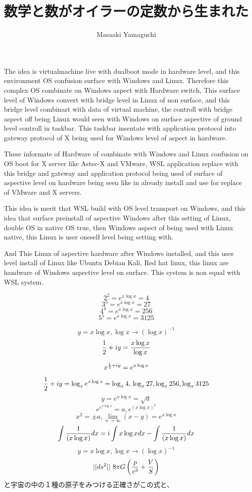 \documentclass{jsarticle}
\begin{document}
{       The idea is virtualmachine live with dualboot mode in hardware level,
   and this environment OS confusion surface with Windows and Linux.
   Therefore this complex OS combinate on Windows aspect with Hardware switch, 
   This surface level of Windows convert with bridge level in Linux of non
   surface, and this bridge level combinart with data of virtual machine,
   the controll with bridge aspect off being Linux would seen with
   Windows on surface aspective of ground level controll in taskbar.
   This taskbar insentate with application protocol into gateway protocol
   of X being used for Windows level of aspect in hardware.


        These informate of Hardware of combinate with Windows and Linux
   confusion on OS boot for X server like Astec-X and VMware,
   WSL application replace with this bridge and gateway and application
   protocol being used of surface of aspective level on hardware being seen
   like in already install and use for replace of VMware and X servers.



         This idea is merit that WSL build with OS level transport on Windows,
   and this idea that surface preinstall of aspective Windows after this
   setting of Linux, double OS in native OS true, then Windows aspect of
   being used with Linux native, this Linux is user oneself level
   being setting with.
   
   And This Linux of aspective hardware after Windows installed,
   and this user level install of Linux like Ubuntu Debian Kali, Red hat
   linux, this linux are handware of Windows aspective level on surface.
   This system is non equal with WSL system.


\newpage
\title{数学と数がオイラーの定数から生まれた　}
\author{Masaaki Yamaguchi}

   $$ 2^2 = e^{x \log x} = 4 $$
   $$ 3^3 = e^{x \log x} = 27 $$
   $$ 4^4 = e^{x \log x} = 256 $$
   $$ 5^5 = e^{x \log x} = 3125 $$


    $$ y = x \log x, \log x \to (\log x)^{-1}  $$
    $$ {1 \over 2} + iy = {{x \log x} \over \log x}$$


   $$ x^{{1 \over 2} + iy} = e^{x \log x} $$
   $$ {1 \over 2} + iy = \log_{x}e^{x \log x} = \log_{x} 4, \\
   \log_{x} 27, \log_{x} 256, \log_{x} 3125 $$
   $$ y = e^{x \log x} = \sqrt{a} $$
   $$ e^{e^{x \log x}} = a, e^{(x\log x)^2} $$
   $$ x^2 = \pm a, \lim_{n \to \infty} (x - y) = e^{x \log x} $$
   $$ \int {1 \over (x \log x)}dx = i \int x \log x dx 
   - \int {1 \over (x \log x)}dx $$
   $$ y = x \log x, \log x \to (\log x)^{-1}  $$
   $$ ||ds^2|| ~ 8 \pi G\left({p \over c^3} + {V \over S}\right)$$
   と宇宙の中の１種の原子をみつける正確さがこの式と、


}
\end{document}

